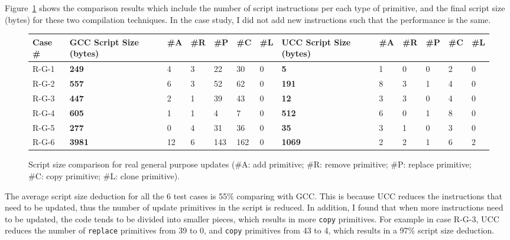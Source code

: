 Figure~\ref{fdeluge.data} shows the comparison results which include the number of script instructions per each type of primitive, and the final script size (bytes) for these two compilation techniques. In the case study, I did not add new instructions such that the performance is the same.

\begin{figure}[htbp]
\begin{center}
\begin{small}
\begin{tabular}{||p{0.5in}||p{0.38in}|p{0.15in} p{0.15in} p{0.2in} p{0.2in} p{0.15in}||
                           p{0.38in}|p{0.15in} p{0.15in} p{0.2in} p{0.2in} p{0.15in}||} \hline

Case \# & GCC Script Size (bytes) & \#A & \#R & \#P & \#C & \#L &  
          UCC Script Size (bytes) & \#A & \#R & \#P & \#C & \#L  \\ \hline \hline

R-G-1 &  \bf249 & 4&3&22&30&0    &\bf5  & 1&0&0&2&0  \\  \hline
R-G-2 &  \bf557 & 6&3&52&62&0    &\bf191& 8&3&1&4&0  \\  \hline
R-G-3 &  \bf447 & 2&1&39&43&0    &\bf12 &3&3&0&4&0   \\  \hline
R-G-4 &  \bf605 & 1&1& 4& 7&0    &\bf512 &6&0&1&8&0  \\  \hline
R-G-5 &  \bf277 & 0&4&31&36&0    &\bf35 &3&1&0&3&0  \\  \hline
R-G-6 &  \bf3981& 12&6&143&162&0 &\bf1069 &2&2&1&6&2 \\  \hline

\end{tabular}
\end{small}
\end{center}
\caption[Script size comparison for real purpose updates.]{Script size comparison for real general purpose updates (\#A: add primitive; \#R: remove primitive; \#P: replace primitive; \#C: copy primitive; \#L: clone primitive).}
\label{fdeluge.data}
\end{figure}

The average script size deduction for all the 6 test cases is 55\% comparing with GCC. This is because UCC reduces the instructions that need to be updated, thus the number of update primitives in the script is reduced. In addition, I found that when more instructions need to be updated, the code tends to be divided into smaller pieces, which results in more {\tt copy} primitives. For example in case R-G-3, UCC reduces the number of {\tt replace} primitives from 39 to 0, and {\tt copy} primitives from 43 to 4, which results in a 97\% script size deduction.


